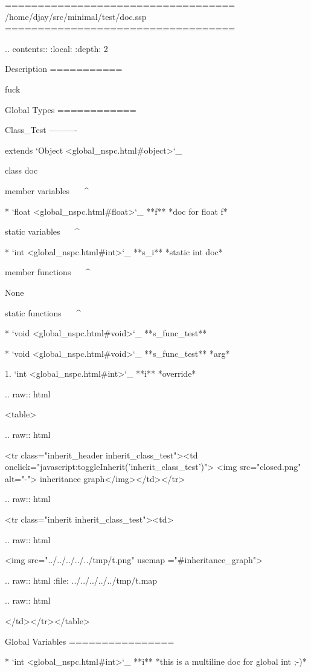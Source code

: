 ===================================
/home/djay/src/minimal/test/doc.ssp
===================================


.. contents::
   :local:
   :depth: 2

Description
===========



 fuck

Global Types
============

Class_Test
----------

extends `Object <global_nspc.html#object>`_ 

 class doc

member variables
^^^^^^^^^^^^^^^^

	* `float <global_nspc.html#float>`_ **f** *doc for float f* 


static variables
^^^^^^^^^^^^^^^^

	* `int <global_nspc.html#int>`_ **s_i** *static int doc* 


member functions
^^^^^^^^^^^^^^^^


	None

static functions
^^^^^^^^^^^^^^^^

	* `void <global_nspc.html#void>`_ **s_func_test**

	* `void <global_nspc.html#void>`_ **s_func_test**	*arg*

		1. `int <global_nspc.html#int>`_ **i** *override*


  .. raw:: html

   <table>


  .. raw:: html

   <tr class="inherit_header inherit_class_test"><td onclick="javascript:toggleInherit('inherit_class_test')"> <img src="closed.png" alt="-"> inheritance graph</img></td></tr>


  .. raw:: html

   <tr class="inherit inherit_class_test"><td>


  .. raw:: html

   <img src="../../../../../tmp/t.png" usemap ="#inheritance_graph">


  .. raw:: html
   :file:   ../../../../../tmp/t.map


  .. raw:: html

   </td></tr></table>

Global Variables
================

	* `int <global_nspc.html#int>`_ **i** *this is  a multiline doc for global int ;-)*


